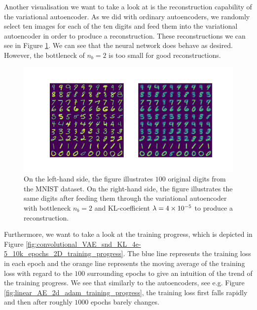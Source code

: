 Another visualisation we want to take a look at is the reconstruction capability of the variational autoencoder. As we did with ordinary autoencoders, we randomly select ten images for each of the ten digits and feed them into the variational autoencoder in order to produce a reconstruction. These reconstructions we can see in Figure \ref{fig:convolutional_VAE_snd_KL_4e-5_10k_epochs_2D_inference}. We can see that the neural network does behave as desired. However, the bottleneck of $n_b=2$ is too small for good reconstructions.

\begin{figure}
\begin{center}
      \includegraphics[trim = 15mm 10mm 15mm 15mm, clip, width=\linewidth]{convolutional_VAE_snd_KL_4e-5_10k_epochs_2D_inference}
\end{center}
\caption{On the left-hand side, the figure illustrates $100$ original digits from the MNIST dataset. On the right-hand side, the figure illustrates the same digits after feeding them through the variational autoencoder with bottleneck $n_b=2$ and KL-coefficient $\lambda = \num{4e-5}$ to produce a reconstruction.}\label{fig:convolutional_VAE_snd_KL_4e-5_10k_epochs_2D_inference}
\end{figure}


Furthermore, we want to take a look at the training progress, which is depicted in Figure \ref{fig:convolutional_VAE_snd_KL_4e-5_10k_epochs_2D_training_progress}. The blue line represents the training loss in each epoch and the orange line represents the moving average of the training loss with regard to the $100$ surrounding epochs to give an intuition of the trend of the training progress. We see that similarly to the autoencoders, see e.g. Figure \ref{fig:linear_AE_2d_adam_training_progress}, the training loss first falls rapidly and then after roughly $1000$ epochs barely changes.


